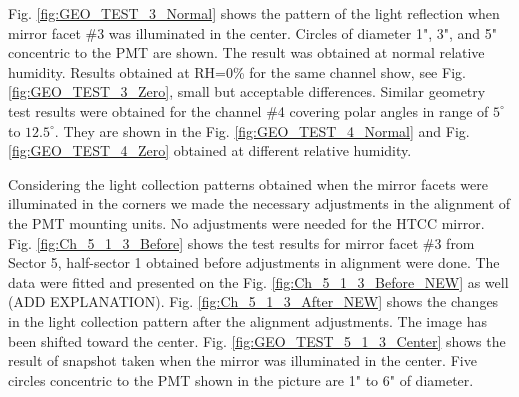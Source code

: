 Fig. \ref{fig:GEO_TEST_3_Normal} shows the pattern of the light reflection when mirror facet \#3 was illuminated in the center. Circles of diameter 1", 3", and 5" concentric to the PMT are shown. The result was obtained at normal relative humidity. Results obtained at RH=0\% for the same channel show, see Fig. \ref{fig:GEO_TEST_3_Zero}, small but acceptable differences. Similar geometry test results were obtained for the channel \#4 covering polar angles in range of $5^\circ$ to $12.5^\circ$. They are shown in the Fig. \ref{fig:GEO_TEST_4_Normal} and  Fig. \ref{fig:GEO_TEST_4_Zero} obtained at different relative humidity.

Considering the light collection patterns obtained when the mirror facets were illuminated in the corners we made the necessary adjustments in the alignment of the PMT mounting units. No adjustments were needed for the HTCC mirror. Fig. \ref{fig:Ch_5_1_3_Before} shows the test results for mirror facet \#3 from Sector 5, half-sector 1 obtained before adjustments in alignment were done. The data were fitted and presented on the Fig. \ref{fig:Ch_5_1_3_Before_NEW} as well (ADD EXPLANATION). Fig. \ref{fig:Ch_5_1_3_After_NEW} shows the changes in the light collection pattern after the alignment adjustments. The image has been shifted toward the center. Fig. \ref{fig:GEO_TEST_5_1_3_Center} shows the result of snapshot taken when the mirror was illuminated in the center. Five circles concentric to the PMT shown in the picture are 1" to 6" of diameter. 

